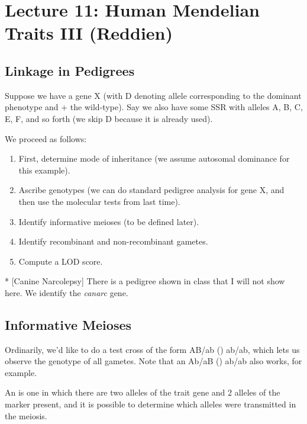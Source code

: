 \section*{Lecture 11: Human Mendelian Traits III (Reddien)}
\setcounter{section}{11}

\subsection{Linkage in Pedigrees}

Suppose we have a gene X (with D denoting allele corresponding to the dominant phenotype and + the wild-type).
Say we also have some SSR with alleles A, B, C, E, F, and so forth (we skip D because it is already used).

We proceed as follows:

\begin{enumerate}
	\item First, determine mode of inheritance (we assume autosomal dominance for this example).
	\item Ascribe genotypes (we can do standard pedigree analysis for gene X, and then use the molecular tests from last time).
	\item Identify informative meioses (to be defined later).
	\item Identify recombinant and non-recombinant gametes.
	\item Compute a LOD score.
\end{enumerate}

\begin{exm}*
	[Canine Narcolepsy]
	There is a pedigree shown in class that I will not show here. 
	We identify the \emph{canarc} gene.
\end{exm}

\subsection*{Informative Meioses}

Ordinarily, we'd like to do a test cross of the form AB/ab (\x) ab/ab, which lets us observe the genotype of all gametes.
Note that an Ab/aB (\x) ab/ab also works, for example.

\begin{defn}
	An  is one in which there are two alleles of the trait gene and 2 alleles of the marker present, and it is possible to determine which alleles were transmitted in the meiosis.
\end{defn}

